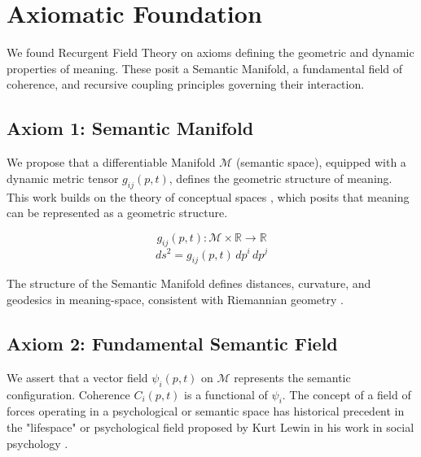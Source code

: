 \chapter{Axiomatic Foundation}\label{ch:axiomatic_foundation}

We found Recurgent Field Theory on axioms defining the geometric and dynamic properties of meaning. These posit a Semantic Manifold, a fundamental field of coherence, and recursive coupling principles governing their interaction.


\section{Axiom 1: Semantic Manifold}\label{axiom_1}

We propose that a differentiable Manifold \(\mathcal{M}\) (semantic space), equipped with a dynamic metric tensor \(g_{ij}(p,t)\), defines the geometric structure of meaning. This work builds on the theory of conceptual spaces \autocite{Gardenfors2000}, which posits that meaning can be represented as a geometric structure.

\begin{equation}
g_{ij}(p,t) : \mathcal{M} \times \mathbb{R} \rightarrow \mathbb{R}
\end{equation}
\begin{equation}
ds^2 = g_{ij}(p,t) \, dp^i \, dp^j
\end{equation}

The structure of the Semantic Manifold defines distances, curvature, and geodesics in meaning-space, consistent with Riemannian geometry \autocite{Riemann1868}.


\section{Axiom 2: Fundamental Semantic Field}\label{axiom_2}

We assert that a vector field \(\psi_i(p,t)\) on \(\mathcal{M}\) represents the semantic configuration. Coherence \(C_i(p,t)\) is a functional of \(\psi_i\). The concept of a field of forces operating in a psychological or semantic space has historical precedent in the "lifespace" or psychological field proposed by Kurt Lewin in his work in social psychology \autocite{Lewin1951}.

